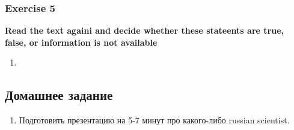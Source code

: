 \documentclass{article}
\begin{document}
\subsubsection{Exercise 5}

\textbf{Read the text againi and decide whether these stateents are true, false, or information is not available}

\begin{enumerate}
    \item 
\end{enumerate}

\subsection{Домашнее задание}

\begin{enumerate}
    \item Подготовить презентацию на 5-7 минут про какого-либо russian scientist.
\end{enumerate}
\end{document}
